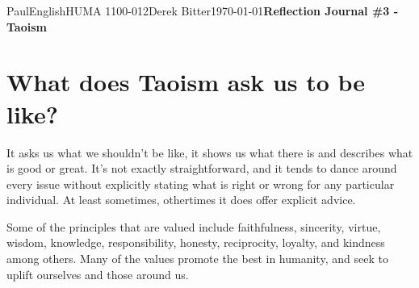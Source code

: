 \documentclass[12pt,letterpaper]{article}
\begin{document}
\begin{mla}{Paul}{English}{HUMA 1100-012}{Derek Bitter}{\today}{\textbf{Reflection Journal \#3 - Taoism}}

\section{What does Taoism ask us to be like?}








  
  
  




It asks us what we shouldn't be like, it shows us what there is
and describes what is good or great. It's not exactly straightforward,
and it tends to dance around every issue without explicitly stating
what is right or wrong for any particular individual. At least
sometimes, othertimes it does offer explicit advice.

Some of the principles that are valued include faithfulness,
sincerity, virtue, wisdom, knowledge, responsibility, honesty,
reciprocity, loyalty, and kindness among others. Many of the values
promote the best in humanity, and seek to uplift ourselves and those
around us.


\end{mla}
\end{document}

